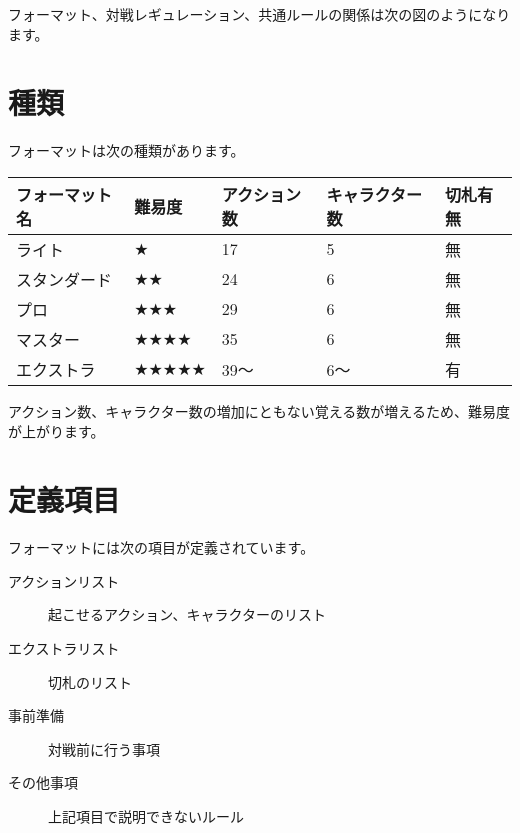 \documentclass[letterpaper,10pt,dvipdfmx]{sphinxmanual}
\begin{document}
フォーマット、対戦レギュレーション、共通ルールの関係は次の図のようになります。

\noindent{}


\section{種類}
\label{\detokenize{format/format:id5}}
フォーマットは次の種類があります。


\begin{savenotes}\sphinxattablestart
\centering
\begin{tabulary}{\linewidth}[t]{|T|T|T|T|T|}
\hline
\sphinxstyletheadfamily 
フォーマット名
&\sphinxstyletheadfamily 
難易度
&\sphinxstyletheadfamily 
アクション数
&\sphinxstyletheadfamily 
キャラクター数
&\sphinxstyletheadfamily 
切札有無
\\
\hline
ライト
&
★
&
17
&
5
&
無
\\
\hline
スタンダード
&
★★
&
24
&
6
&
無
\\
\hline
プロ
&
★★★
&
29
&
6
&
無
\\
\hline
マスター
&
★★★★
&
35
&
6
&
無
\\
\hline
エクストラ
&
★★★★★
&
39〜
&
6〜
&
有
\\
\hline
\end{tabulary}
\par
\sphinxattableend\end{savenotes}

アクション数、キャラクター数の増加にともない覚える数が増えるため、難易度が上がります。


\section{定義項目}
\label{\detokenize{format/format:id6}}
フォーマットには次の項目が定義されています。
\begin{description}
\item[{アクションリスト}] \leavevmode
起こせるアクション、キャラクターのリスト

\item[{エクストラリスト}] \leavevmode
切札のリスト

\item[{事前準備}] \leavevmode
対戦前に行う事項

\item[{その他事項}] \leavevmode
上記項目で説明できないルール

\end{description}
\end{document}
